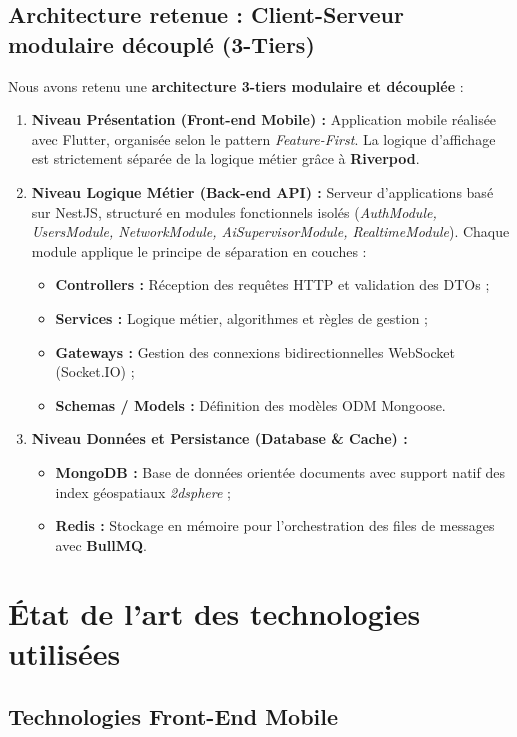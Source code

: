 \subsection{Architecture retenue : Client-Serveur modulaire d\'ecoupl\'e (3-Tiers)}
Nous avons retenu une \textbf{architecture 3-tiers modulaire et d\'ecoupl\'ee} :
\begin{enumerate}
    \item \textbf{Niveau Pr\'esentation (Front-end Mobile) :} Application mobile r\'ealis\'ee avec Flutter, organis\'ee selon le pattern \textit{Feature-First}. La logique d'affichage est strictement s\'epar\'ee de la logique m\'etier gr\^ace \`a \textbf{Riverpod}.
    \item \textbf{Niveau Logique M\'etier (Back-end API) :} Serveur d'applications bas\'e sur NestJS, structur\'e en modules fonctionnels isol\'es (\textit{AuthModule, UsersModule, NetworkModule, AiSupervisorModule, RealtimeModule}). Chaque module applique le principe de s\'eparation en couches :
    \begin{itemize}
        \item \textbf{Controllers :} R\'eception des requ\^etes HTTP et validation des DTOs ;
        \item \textbf{Services :} Logique m\'etier, algorithmes et r\`egles de gestion ;
        \item \textbf{Gateways :} Gestion des connexions bidirectionnelles WebSocket (Socket.IO) ;
        \item \textbf{Schemas / Models :} D\'efinition des mod\`eles ODM Mongoose.
    \end{itemize}
    \item \textbf{Niveau Donn\'ees et Persistance (Database \& Cache) :} 
    \begin{itemize}
        \item \textbf{MongoDB :} Base de donn\'ees orient\'ee documents avec support natif des index g\'eospatiaux \textit{2dsphere} ;
        \item \textbf{Redis :} Stockage en m\'emoire pour l'orchestration des files de messages avec \textbf{BullMQ}.
    \end{itemize}
\end{enumerate}

\section{\'Etat de l'art des technologies utilis\'ees}

\subsection{Technologies Front-End Mobile}

